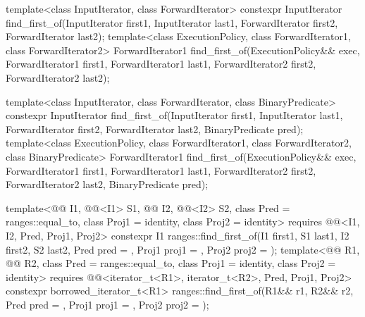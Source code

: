 %
\begin{itemdecl}
template<class InputIterator, class ForwardIterator>
  constexpr InputIterator
    find_first_of(InputIterator first1, InputIterator last1,
                  ForwardIterator first2, ForwardIterator last2);
template<class ExecutionPolicy, class ForwardIterator1, class ForwardIterator2>
  ForwardIterator1
    find_first_of(ExecutionPolicy&& exec,
                  ForwardIterator1 first1, ForwardIterator1 last1,
                  ForwardIterator2 first2, ForwardIterator2 last2);

template<class InputIterator, class ForwardIterator,
         class BinaryPredicate>
  constexpr InputIterator
    find_first_of(InputIterator first1, InputIterator last1,
                  ForwardIterator first2, ForwardIterator last2,
                  BinaryPredicate pred);
template<class ExecutionPolicy, class ForwardIterator1, class ForwardIterator2,
         class BinaryPredicate>
  ForwardIterator1
    find_first_of(ExecutionPolicy&& exec,
                  ForwardIterator1 first1, ForwardIterator1 last1,
                  ForwardIterator2 first2, ForwardIterator2 last2,
                  BinaryPredicate pred);

template<@@ I1, @@<I1> S1, @@ I2, @@<I2> S2,
         class Pred = ranges::equal_to, class Proj1 = identity, class Proj2 = identity>
  requires @@<I1, I2, Pred, Proj1, Proj2>
  constexpr I1 ranges::find_first_of(I1 first1, S1 last1, I2 first2, S2 last2,
                                     Pred pred = {},
                                     Proj1 proj1 = {}, Proj2 proj2 = {});
template<@@ R1, @@ R2,
         class Pred = ranges::equal_to, class Proj1 = identity, class Proj2 = identity>
  requires @@<iterator_t<R1>, iterator_t<R2>, Pred, Proj1, Proj2>
  constexpr borrowed_iterator_t<R1>
    ranges::find_first_of(R1&& r1, R2&& r2,
                          Pred pred = {},
                          Proj1 proj1 = {}, Proj2 proj2 = {});


\end{itemdecl}
